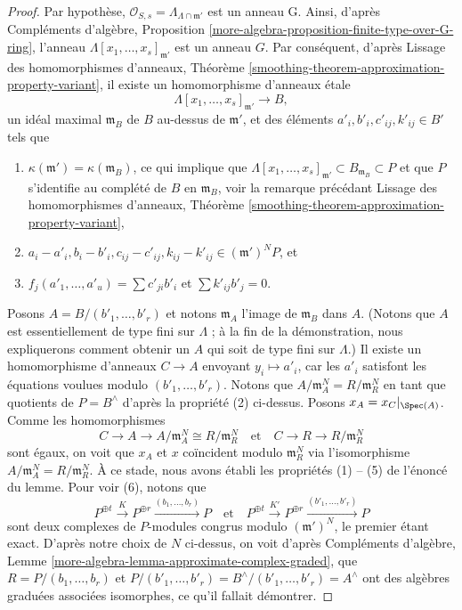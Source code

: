 \begin{proof}
\medskip\noindent
Par hypothèse, $\mathcal{O}_{S, s} = \Lambda_{\Lambda \cap \mathfrak m'}$ est
un anneau G. Ainsi, d'après Compléments d'algèbre, Proposition
\ref{more-algebra-proposition-finite-type-over-G-ring},
l'anneau $\Lambda[x_1, \ldots, x_s]_{\mathfrak m'}$ est un anneau $G$.
Par conséquent, d'après Lissage des homomorphismes d'anneaux, Théorème
\ref{smoothing-theorem-approximation-property-variant},
il existe un homomorphisme d'anneaux \'etale
$$
\Lambda[x_1, \ldots, x_s]_{\mathfrak m'} \to B,
$$
un idéal maximal $\mathfrak m_B$ de $B$ au-dessus de $\mathfrak m'$, et
des éléments $a'_i, b'_i, c'_{ij}, k'_{ij} \in B'$ tels que
\begin{enumerate}
\item $\kappa(\mathfrak m') = \kappa(\mathfrak m_B)$, ce qui implique
que $\Lambda[x_1, \ldots, x_s]_{\mathfrak m'} \subset B_{\mathfrak m_B}
\subset P$ et que $P$ s'identifie au complété de $B$ en
$\mathfrak m_B$, voir la remarque précédant Lissage des homomorphismes d'anneaux, Théorème
\ref{smoothing-theorem-approximation-property-variant},
\item $a_i - a'_i, b_i - b'_i, c_{ij} - c'_{ij}, k_{ij} - k'_{ij} \in
(\mathfrak m')^N P$, et
\item $f_j(a'_1, \ldots, a'_u) = \sum c'_{ji} b'_i$ et $\sum k'_{ij}b'_j = 0$.
\end{enumerate}
Posons $A = B/(b'_1, \ldots, b'_r)$ et notons $\mathfrak m_A$ l'image de
$\mathfrak m_B$ dans $A$. (Notons que $A$ est essentiellement de type
fini sur $\Lambda$ ; à la fin de la démonstration, nous expliquerons comment obtenir
un $A$ qui soit de type fini sur $\Lambda$.) Il existe un homomorphisme d'anneaux
$C \to A$ envoyant $y_i \mapsto a'_i$, car les $a'_i$ satisfont
les équations voulues modulo $(b'_1, \ldots, b'_r)$.
Notons que $A/\mathfrak m_A^N = R/\mathfrak m_R^N$ en tant que quotients de
$P = B^\wedge$ d'après la propriété (2) ci-dessus. Posons $x_A = x_C|_{\Spec(A)}$.
Comme les homomorphismes
$$
C \to A \to A/\mathfrak m_A^N \cong R/\mathfrak m_R^N
\quad\text{et}\quad
C \to R \to R/\mathfrak m_R^N
$$
sont égaux, on voit que $x_A$ et $x$ coïncident modulo $\mathfrak m_R^N$
via l'isomorphisme $A/\mathfrak m_A^N = R/\mathfrak m_R^N$. À ce
stade, nous avons établi les propriétés (1) -- (5) de l'énoncé du lemme.
Pour voir (6), notons que
$$
P^{\oplus t} \xrightarrow{K}
P^{\oplus r} \xrightarrow{(b_1, \ldots, b_r)}
P
\quad\text{et}\quad
P^{\oplus t} \xrightarrow{K'}
P^{\oplus r} \xrightarrow{(b'_1, \ldots, b'_r)}
P
$$
sont deux complexes de $P$-modules congrus modulo
$(\mathfrak m')^N$, le premier étant exact. D'après notre choix de $N$
ci-dessus, on voit d'après
Compléments d'algèbre, Lemme \ref{more-algebra-lemma-approximate-complex-graded},
que $R = P/(b_1, \ldots, b_r)$ et
$P/(b'_1, \ldots, b'_r) = B^\wedge/(b'_1, \ldots, b'_r) = A^\wedge$
ont des algèbres graduées associées isomorphes, ce qu'il fallait démontrer.


\end{proof}

